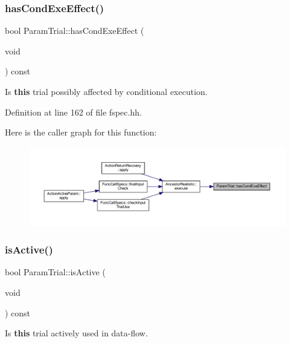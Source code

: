 \subsubsection{\texorpdfstring{hasCondExeEffect()}{hasCondExeEffect()}}
{\footnotesize\ttfamily bool Param\+Trial\+::has\+Cond\+Exe\+Effect (\begin{DoxyParamCaption}\item[{void}]{ }\end{DoxyParamCaption}) const\hspace{0.3cm}{\ttfamily [inline]}}



Is {\bfseries{this}} trial possibly affected by conditional execution. 



Definition at line 162 of file fspec.\+hh.

Here is the caller graph for this function\+:
\nopagebreak
\begin{figure}[H]
\begin{center}
\leavevmode
\includegraphics[width=350pt]{class_param_trial_a89e3ae18b8365695196d1202d3851e98_icgraph}
\end{center}
\end{figure}
\mbox{\label{class_param_trial_a2b98b8c531ad081df9e4eb703ece9dc3}} 
\subsubsection{\texorpdfstring{isActive()}{isActive()}}
{\footnotesize\ttfamily bool Param\+Trial\+::is\+Active (\begin{DoxyParamCaption}\item[{void}]{ }\end{DoxyParamCaption}) const\hspace{0.3cm}{\ttfamily [inline]}}



Is {\bfseries{this}} trial actively used in data-\/flow. 



